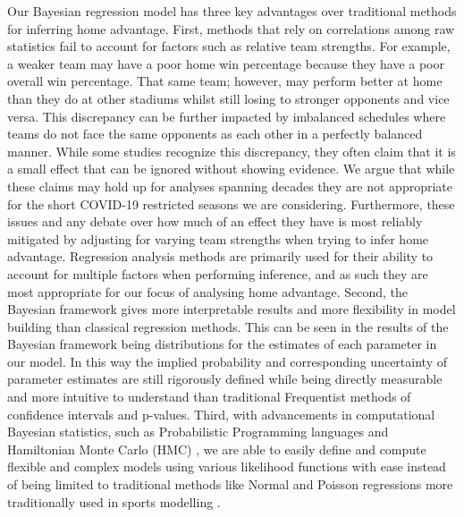 Our Bayesian regression model has three key advantages over traditional methods for inferring home advantage. First, methods that rely on correlations among raw statistics fail to account for factors such as relative team strengths. For example, a weaker team may have a poor home win percentage because they have a poor overall win percentage. That same team; however, may perform better at home than they do at other stadiums whilst still losing to stronger opponents and vice versa. This discrepancy can be further impacted by imbalanced schedules where teams do not face the same opponents as each other in a perfectly balanced manner. While some studies recognize this discrepancy, they often claim that it is a small effect that can be ignored \cite{Pollard2005a} without showing evidence. We argue that while these claims may hold up for analyses spanning decades they are not appropriate for the short COVID-19 restricted seasons we are considering. Furthermore, these issues and any debate over how much of an effect they have is most reliably mitigated by adjusting for varying team strengths when trying to infer home advantage. Regression analysis methods are primarily used for their ability to account for multiple factors when performing inference, and as such they are most appropriate for our focus of analysing home advantage. Second, the Bayesian framework gives more interpretable results and more flexibility in model building than classical regression methods. This can be seen in the results of the Bayesian framework being distributions for the estimates of each parameter in our model. In this way the implied probability and corresponding uncertainty of parameter estimates are still rigorously defined while being directly measurable and more intuitive to understand than traditional Frequentist methods of confidence intervals and p-values. Third, with advancements in computational Bayesian statistics, such as Probabilistic Programming languages \cite{pymc3} and Hamiltonian Monte Carlo (HMC) \cite{Betancourt2017}, we are able to easily define and compute flexible and complex models using various likelihood functions with ease instead of being limited to traditional methods like Normal and Poisson regressions more traditionally used in sports modelling \cite{Lopez2018} \cite{Glickman1998} \cite{Karlis2003} \cite{Baio2010} \cite{Benz2020}.

